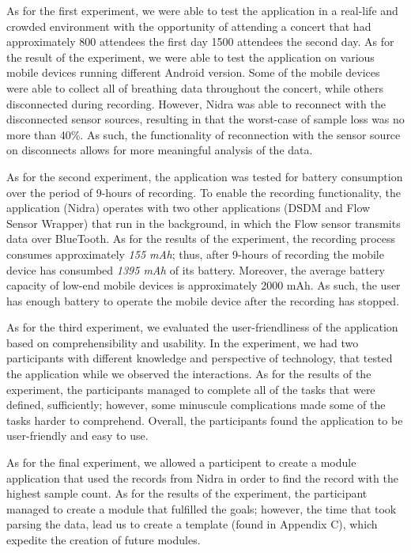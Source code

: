 As for the first experiment, we were able to test the application in a real-life and crowded environment with the opportunity of attending a concert that had approximately 800 attendees the first day 1500 attendees the second day. As for the result of the experiment, we were able to test the application on various mobile devices running different Android version. Some of the mobile devices were able to collect all of breathing data throughout the concert, while others disconnected during recording. However, Nidra was able to reconnect with the disconnected sensor sources, resulting in that the worst-case of sample loss was no more than 40\%. As such, the functionality of reconnection with the sensor source on disconnects allows for more meaningful analysis of the data.

As for the second experiment, the application was tested for battery consumption over the period of 9-hours of recording. To enable the recording functionality, the application (Nidra) operates with two other applications (DSDM and Flow Sensor Wrapper) that run in the background, in which the Flow sensor transmits data over BlueTooth. As for the results of the experiment, the recording process consumes approximately \textit{155 mAh}; thus, after 9-hours of recording the mobile device has consumbed \textit{1395 mAh} of its battery. Moreover, the average battery capacity of low-end mobile devices is approximately 2000 mAh. As such, the user has enough battery to operate the mobile device after the recording has stopped. 

As for the third experiment, we evaluated the user-friendliness of the application based on comprehensibility and usability. In the experiment, we had two participants with different knowledge and perspective of technology, that tested the application while we observed the interactions. As for the results of the experiment, the participants managed to complete all of the tasks that were defined, sufficiently; however, some minuscule complications made some of the tasks harder to comprehend. Overall, the participants found the application to be user-friendly and easy to use. 

As for the final experiment, we allowed a participent to create a module application that used the records from Nidra in order to find the record with the highest sample count. As for the results of the experiment, the participant managed to create a module that fulfilled the goals; however, the time that took parsing the data, lead us to create a template (found in Appendix C), which expedite the creation of future modules. 

